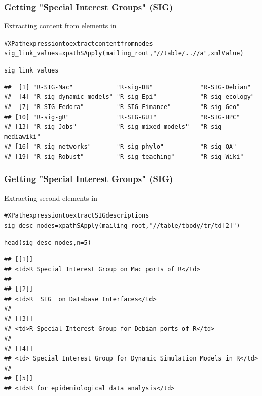 \documentclass{beamer}\usepackage[]{graphicx}\usepackage[]{color}
\makeatletter
\newcommand{\hlnum}[1]{\textcolor[rgb]{0.063,0.58,0.627}{#1}}%
\newcommand{\hlstr}[1]{\textcolor[rgb]{0.063,0.58,0.627}{#1}}%
\newcommand{\hlcom}[1]{\textcolor[rgb]{0.588,0.588,0.588}{#1}}%
\newcommand{\hlstd}[1]{\textcolor[rgb]{0.196,0.196,0.196}{#1}}%
\newcommand{\hlkwb}[1]{\textcolor[rgb]{0.627,0,0.314}{#1}}%
\newcommand{\hlkwc}[1]{\textcolor[rgb]{0,0.631,0.314}{#1}}%
\newcommand{\hlkwd}[1]{\textcolor[rgb]{0.78,0.227,0.412}{#1}}%
\newenvironment{kframe}{%
 \def\at@end@of@kframe{}%
 \ifinner\ifhmode%
  \def\at@end@of@kframe{\end{minipage}}%
  \begin{minipage}{\columnwidth}%
 \fi\fi%
 \def\FrameCommand##1{\hskip\@totalleftmargin \hskip-\fboxsep
 \colorbox{shadecolor}{##1}\hskip-\fboxsep
     \hskip-\linewidth \hskip-\@totalleftmargin \hskip\columnwidth}%
 \MakeFramed {\advance\hsize-\width
   \@totalleftmargin\z@ \linewidth\hsize
   \@setminipage}}%
 {\par\unskip\endMakeFramed%
 \at@end@of@kframe}
\newenvironment{knitrout}{}{} %
\makeatother
\begin{document}
\begin{frame}[fragile]
\frametitle{Getting "Special Interest Groups" (SIG)}

Extracting content from  elements in 
\begin{knitrout}\tiny
{}\color{fgcolor}\begin{kframe}
\begin{alltt}
\hlcom{# XPath expression to extract content from nodes}
\hlstd{sig_link_values} \hlkwb{=} \hlkwd{xpathSApply}\hlstd{(mailing_root,} \hlstr{"//table/..//a"}\hlstd{, xmlValue)}

\hlstd{sig_link_values}
\end{alltt}
\begin{verbatim}
##  [1] "R-SIG-Mac"            "R-sig-DB"             "R-SIG-Debian"        
##  [4] "R-sig-dynamic-models" "R-sig-Epi"            "R-sig-ecology"       
##  [7] "R-SIG-Fedora"         "R-SIG-Finance"        "R-sig-Geo"           
## [10] "R-sig-gR"             "R-SIG-GUI"            "R-SIG-HPC"           
## [13] "R-sig-Jobs"           "R-sig-mixed-models"   "R-sig-mediawiki"     
## [16] "R-sig-networks"       "R-sig-phylo"          "R-sig-QA"            
## [19] "R-sig-Robust"         "R-sig-teaching"       "R-sig-Wiki"
\end{verbatim}
\end{kframe}
\end{knitrout}

\end{frame}


\begin{frame}[fragile]
\frametitle{Getting "Special Interest Groups" (SIG)}

Extracting second  elements in  
\begin{knitrout}\tiny
{}\color{fgcolor}\begin{kframe}
\begin{alltt}
\hlcom{# XPath expression to extract SIG descriptions}
\hlstd{sig_desc_nodes} \hlkwb{=} \hlkwd{xpathSApply}\hlstd{(mailing_root,} \hlstr{"//table/tbody/tr/td[2]"}\hlstd{)}

\hlkwd{head}\hlstd{(sig_desc_nodes,} \hlkwc{n} \hlstd{=} \hlnum{5}\hlstd{)}
\end{alltt}
\begin{verbatim}
## [[1]]
## <td>R Special Interest Group on Mac ports of R</td> 
## 
## [[2]]
## <td>R  SIG  on Database Interfaces</td> 
## 
## [[3]]
## <td>R Special Interest Group for Debian ports of R</td> 
## 
## [[4]]
## <td> Special Interest Group for Dynamic Simulation Models in R</td> 
## 
## [[5]]
## <td>R for epidemiological data analysis</td>
\end{verbatim}
\end{kframe}
\end{knitrout}

\end{frame}
\end{document}
